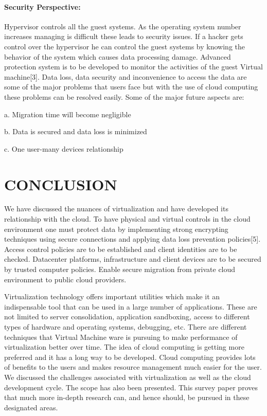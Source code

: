 \paragraph{Security Perspective:} Hypervisor controls all the guest systems. As the operating system number increases managing is difficult these leads to security issues. If a hacker gets control over the hypervisor he can control the guest systems by knowing the behavior of the system which causes data processing damage. Advanced protection system is to be developed to monitor the activities of the guest Virtual machine[3].
Data loss, data security and inconvenience to access the data are
some of the major problems that users face but with the use of cloud
computing these problems can be resolved easily. Some of the major
future aspects are:

a. Migration time will become negligible

b. Data is secured and data loss is minimized

c. One user-many devices relationship

\section{CONCLUSION}
We have discussed the nuances of virtualization and have developed its relationship with the cloud. To have physical and virtual controls in the cloud environment one must protect data by implementing strong
encrypting techniques using secure connections and applying data loss prevention policies[5].
Access control policies are to be established and client identities are to be checked.
Datacenter platforms, infrastructure and client devices are to be secured by trusted computer policies.
Enable secure migration from private cloud environment to public cloud providers.

Virtualization technology offers important utilities which make it an indispensable tool that can be used in a large number of applications. These are not limited to server consolidation, application sandboxing, access to  different types of hardware and operating systems, debugging, etc. There are different techniques that Virtual Machine ware is pursuing to make performance of virtualization better over time. The idea of cloud computing is getting more preferred and it has a long way to be developed. Cloud computing provides lots of benefits to the users and makes resource management much easier for the user. We discussed the challenges associated with virtualization as well as the cloud development cycle. The scope has also been presented. This survey paper proves that much more in-depth research can, and hence should, be pursued in these designated areas.

